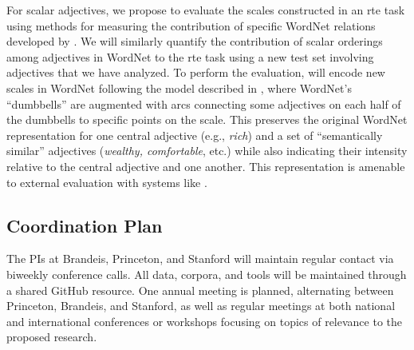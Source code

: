 \documentclass[10pt]{article}
\begin{document}
For scalar adjectives, we propose to evaluate the scales constructed in an {\sc rte} task using methods for measuring the contribution of specific WordNet relations developed by \cite{clark2008using,clark2008augmenting,clark2007role}. 
We will similarly quantify the contribution of scalar orderings among adjectives in WordNet to the {\sc rte} task using a new test set involving adjectives that we have analyzed. 
To perform the evaluation, will encode new scales in WordNet following the model described in 
\cite{sheinmanetal2013}, where WordNet's ``dumbbells'' are augmented with arcs connecting some  adjectives on each half of the dumbbells to specific 
points on the scale. This preserves the original WordNet representation for one central 
adjective (e.g., \emph{rich}) and a set of ``semantically similar'' adjectives (\emph{wealthy, comfortable}, etc.) while also indicating their intensity relative to the central adjective and one another.
This representation is amenable to external evaluation with systems like \cite{clark2007role}.


%


\vspace {-3mm}
\subsection{Coordination Plan}
\vspace {-2mm}

The PIs at Brandeis, Princeton, and Stanford will maintain regular contact via biweekly  conference calls. 
All data, corpora, and tools will be maintained through a shared GitHub resource. 
One annual meeting is planned, alternating between Princeton, Brandeis, and Stanford, as well as regular meetings at both national and international conferences or workshops focusing on topics of relevance to the proposed research. 
\end{document}
